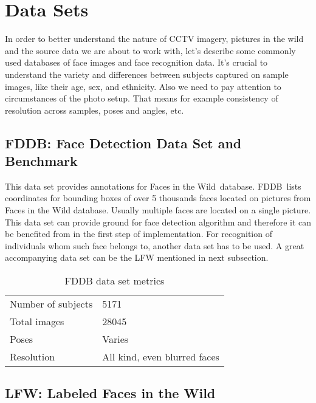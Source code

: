 \section{Data Sets}

In order to better understand the nature of CCTV imagery, pictures in the wild and the source data we are about to work with, let's describe some commonly used databases of face images and face recognition data. It's crucial to understand the variety and differences between subjects captured on sample images, like their age, sex, and ethnicity. Also we need to pay attention to circumstances of the photo setup. That means for example consistency of resolution across samples, poses and angles, etc.

\subsection{FDDB: Face Detection Data Set and Benchmark}

This data set provides annotations for Faces in the Wild\,\cite{fiw} database. FDDB\,\cite{fddb} lists coordinates for bounding boxes of over 5 thousands faces located on pictures from Faces in the Wild database. Usually multiple faces are located on a single picture. This data set can provide ground for face detection algorithm and therefore it can be benefited from in the first step of implementation. For recognition of individuals whom such face belongs to, another data set has to be used. A great accompanying data set can be the LFW mentioned in next subsection.

\begin{table}[ht]
    \centering
    \caption{FDDB data set metrics}

    \begin{tabularx}{0.75\textwidth}{l|l}
        \toprule
        Number of subjects & \num{5171} \\
        Total images &  \num{28045} \\
        Poses & Varies \\
        Resolution & All kind, even blurred faces \\
        \bottomrule
    \end{tabularx}
\end{table}

\subsection{LFW: Labeled Faces in the Wild}

